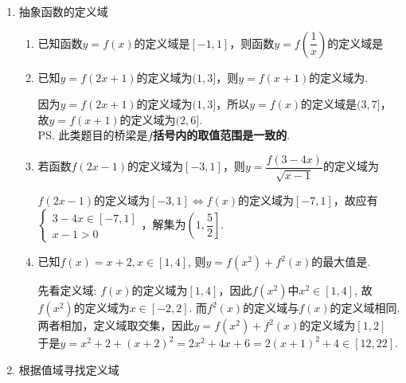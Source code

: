 \begin{enumerate}
\begin{enumerate}
\begin{jieda}
\begin{enumerate}
        \item 问题等价于$y=ax^2+ax+1$的值域包含$(0,+\infty)$. \\
        $a=0$显然不符合条件; \\
        $a\neq 0$时, $a>0$且$\Delta\geq0$, 即$a\geq 4$. \\
        故$a\geq 4$. 
        \end{enumerate}
    \end{jieda}
\end{enumerate}
\item 抽象函数的定义域
\begin{enumerate}
    \item 已知函数$y = f(x)$的定义域是$[-1, 1]$，则函数$y = f\left(\dfrac{1}{x}\right)$的定义域是 \blkda[3]{$(-\infty, -1] \cup [1, +\infty)$}
    \item 已知$y = f(2x+1)$的定义域为$(1, 3]$，则$y = f(x+1)$的定义域为\blkda{$(2, 6]$}. 
    \begin{jieda}
        因为$y = f(2x+1)$的定义域为$(1, 3]$，所以$y = f(x)$的定义域是$(3,7]$，故$y = f(x+1)$的定义域为$(2, 6]$. \\
        \ps 此类题目的桥梁是\textbf{$f$括号内的取值范围是一致的}.
    \end{jieda}
    \item 若函数$f(2x-1)$的定义域为$[-3, 1]$，则$y = \dfrac{f(3-4x)}{\sqrt{x-1}}$的定义域为\blkda{$\left(1, \dfrac{5}{2}\right]$}
    \begin{jieda}
        $f(2x-1)$的定义域为$[-3, 1] \Longleftrightarrow f(x)$的定义域为$[-7, 1]$，故应有$\left\{\begin{array}{l}
             3-4x \in [-7, 1] \\
             x - 1 > 0
        \end{array}\right.$，解集为$\left(1, \dfrac{5}{2}\right]$.
    \end{jieda}
    \item 已知$f(x)=x+2, x\in[1,4]$, 则$y=f(x^2)+f^2(x)$的最大值是. 
    \begin{jieda}
    先看定义域: $f(x)$的定义域为$[1,4]$，因此$f(x^2)$中$x^2\in[1,4]$, 故$f(x^2)$的定义域为$x\in[-2,2]$. 而$f^2(x)$的定义域与$f(x)$的定义域相同.\\
    两者相加，定义域取交集，因此$y=f(x^2)+f^2(x)$的定义域为$[1, 2]$ \\
    于是$y=x^2+2+(x+2)^2=2x^2+4x+6=2(x+1)^2+4\in[12,22]$. 
    \end{jieda}
\end{enumerate}
\item 根据值域寻找定义域

\end{enumerate}
